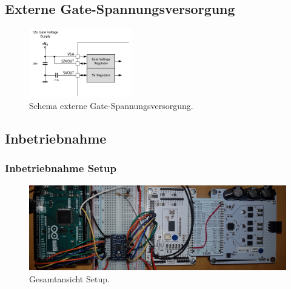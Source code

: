 \subsection{Externe Gate-Spannungsversorgung}\label{Appendix:Gate_Spannungsversorgung}

\begin{figure}[H]
	\centering
	\includegraphics[width=0.4\textwidth]{graphics/Schema_Gate_Treiber_Gatespannung}
	\caption{Schema externe Gate-Spannungsversorgung.\cite[S.11]{trinamicmotion_control_gmbh__co_kg_tmc6200_2019}}
	\label{fig:Schema_Gate_Treiber_Gatespannung}
\end{figure}

\subsection{Inbetriebnahme}

\subsubsection{Inbetriebnahme Setup}\label{Appendix:TMC6200_Setup}

\begin{figure}[H]
	\centering
	\includegraphics[angle=270,width=\textwidth]{graphics/2_komplett1}
	\caption{Gesamtansicht Setup.}
	\label{fig:2_komplett1}
\end{figure}

